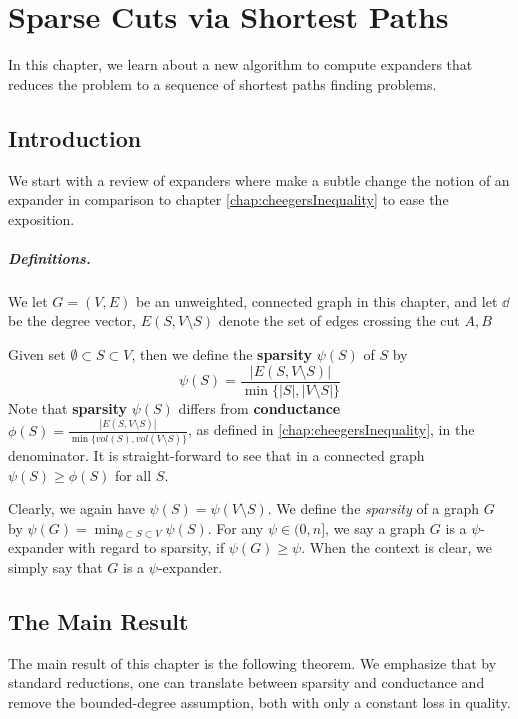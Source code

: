 \chapter{Sparse Cuts via Shortest Paths}

\renewcommand{\vol}{\textit{vol}}
\newcommand{\APSP}{\alpha_{APSP}}

In this chapter, we learn about a new algorithm to compute expanders that reduces the problem to a sequence of shortest paths finding problems.

\section{Introduction}

We start with a review of expanders where make a subtle change the notion of an expander in comparison to chapter \ref{chap:cheegersInequality} to ease the exposition.

\paragraph{Definitions.} We let $G=(V,E)$ be an unweighted, connected graph in this chapter, and let $\dd$ be the degree vector, $E(S,V \setminus S)$ denote the set of edges crossing the cut $A,B$

Given set $\emptyset \subset S \subset V$, then we define the \textbf{sparsity} $\psi(S)$ of $S$ by
\[
\psi(S) = \frac{|E(S, V \setminus S)|}{ \min\{|S|, |V \setminus S| \} } 
\]
Note that \textbf{sparsity} $\psi(S)$ differs from \textbf{conductance} $\phi(S) = \frac{|E(S, V \setminus S)|}{ \min\{\vol(S), \vol(V \setminus S) \} }$, as defined in \ref{chap:cheegersInequality}, in the denominator. It is straight-forward to see that in a connected graph $\psi(S) \geq \phi(S)$ for all $S$. 

Clearly, we again have $\psi(S) = \psi(V \setminus S)$. We define the \emph{sparsity} of a graph $G$ by $\psi(G) = \min_{\emptyset \subset S \subset V} \psi(S)$. For any $\psi \in (0, n]$, we say a graph $G$ is a $\psi$-expander with regard to sparsity, if $\psi(G) \geq \psi$. When the context is clear, we simply say that $G$ is a $\psi$-expander. 

\section{The Main Result}

The main result of this chapter is the following theorem. We emphasize that by standard reductions, one can translate between sparsity and conductance and remove the bounded-degree assumption, both with only a constant loss in quality. 

